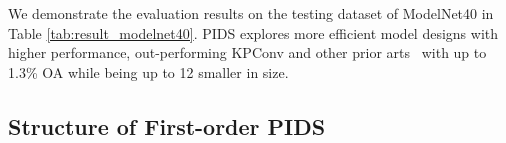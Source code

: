 \documentclass[10pt,twocolumn,letterpaper]{article}
\begin{document}
We demonstrate the evaluation results on the testing dataset of ModelNet40 in Table \ref{tab:result_modelnet40}.
PIDS explores more efficient model designs with higher performance, out-performing KPConv and other prior arts~\cite{goyal2021revisiting} with up to 1.3\% OA while being up to 12 smaller in size.


\subsection{Structure of First-order PIDS}
\begin{table}[h]
\caption{Structure of hand-crafted PIDS (first-order). "1/2" strides means up-sampling by 2, and "O" denotes "Octahedron" kernel with 7 kernel points. All point operators employ a first-order point interaction.}
\begin{center}
\end{center}
\label{tab:pids_1st_order}
\vspace{-2em}
\end{table}
\end{document}
